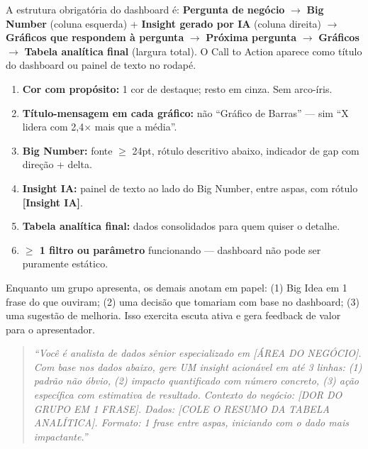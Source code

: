 A estrutura obrigatória do dashboard é: \textbf{Pergunta de negócio} $\to$ \textbf{Big Number} (coluna esquerda) + \textbf{Insight gerado por IA} (coluna direita) $\to$ \textbf{Gráficos que respondem à pergunta} $\to$ \textbf{Próxima pergunta} $\to$ \textbf{Gráficos} $\to$ \textbf{Tabela analítica final} (largura total). O Call to Action aparece como título do dashboard ou painel de texto no rodapé.

\begin{BoardBox}[title=Boas Práticas Obrigatórias no Dashboard]
\begin{enumerate}
  \item \textbf{Cor com propósito:} 1 cor de destaque; resto em cinza. Sem arco-íris.
  \item \textbf{Título-mensagem em cada gráfico:} não ``Gráfico de Barras'' --- sim ``X lidera com 2,4$\times$ mais que a média''.
  \item \textbf{Big Number:} fonte $\geq$ 24pt, rótulo descritivo abaixo, indicador de gap com direção + delta.
  \item \textbf{Insight IA:} painel de texto ao lado do Big Number, entre aspas, com rótulo \textbf{[Insight IA]}.
  \item \textbf{Tabela analítica final:} dados consolidados para quem quiser o detalhe.
  \item \textbf{$\geq$ 1 filtro ou parâmetro} funcionando --- dashboard não pode ser puramente estático.
\end{enumerate}
\end{BoardBox}

Enquanto um grupo apresenta, os demais anotam em papel: (1) Big Idea em 1 frase do que ouviram; (2) uma decisão que tomariam com base no dashboard; (3) uma sugestão de melhoria. Isso exercita escuta ativa e gera feedback de valor para o apresentador.

\begin{BoardBox}[title=Prompt para Gerar o Insight IA (ChatGPT ou Gemini)]
\begin{quote}
\small\textit{``Você é analista de dados sênior especializado em [ÁREA DO NEGÓCIO]. Com base nos dados abaixo, gere UM insight acionável em até 3 linhas: (1) padrão não óbvio, (2) impacto quantificado com número concreto, (3) ação específica com estimativa de resultado. Contexto do negócio: [DOR DO GRUPO EM 1 FRASE]. Dados: [COLE O RESUMO DA TABELA ANALÍTICA]. Formato: 1 frase entre aspas, iniciando com o dado mais impactante.''}
\end{quote}
\end{BoardBox}

